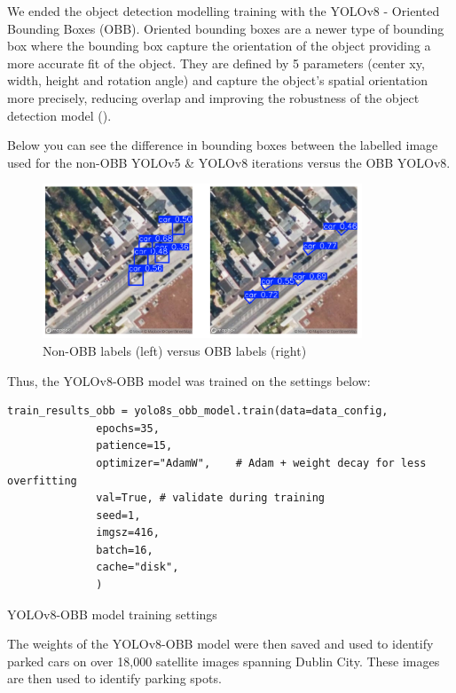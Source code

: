 We ended the object detection modelling training with the YOLOv8 - Oriented
Bounding Boxes (OBB).
Oriented bounding boxes are a newer type of bounding box where the bounding box
capture the orientation of the object providing a more accurate fit of the
object. They are defined by 5 parameters (center xy, width, height and rotation
angle) and capture the object's spatial orientation more precisely, reducing
overlap and improving the robustness of the object detection model
(\cite{obblit}).

Below you can see the difference in bounding boxes between the labelled image
used for the non-OBB YOLOv5 \& YOLOv8 iterations versus the OBB YOLOv8.

\begin{figure}[htbp]
  \centering
  \includegraphics[width=0.85\textwidth]{images/obb-vs-nonobb-img.png}
  \caption{Non-OBB labels (left) versus OBB labels (right)}
\end{figure}

\newpage{}

Thus, the YOLOv8-OBB model was trained on the settings below:

\begin{listing}[htbp]
  \centering
  \begin{verbatim}
train_results_obb = yolo8s_obb_model.train(data=data_config,
              epochs=35,
              patience=15,
              optimizer="AdamW",    # Adam + weight decay for less overfitting
              val=True, # validate during training
              seed=1,
              imgsz=416,
              batch=16,
              cache="disk",
              )
  \end{verbatim}
  \caption{YOLOv8-OBB model training settings}
\end{listing}

The weights of the YOLOv8-OBB model were then saved and used to identify parked
cars on over 18,000 satellite images spanning Dublin City. These images are then
used to identify parking spots.


